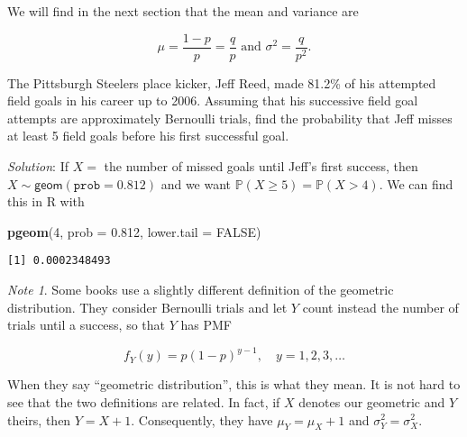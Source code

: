 \documentclass[]{book}
\newenvironment{Shaded}{\begin{snugshade}}{\end{snugshade}}
\newcommand{\KeywordTok}[1]{\textcolor[rgb]{0.13,0.29,0.53}{\textbf{{#1}}}}
\newcommand{\DataTypeTok}[1]{\textcolor[rgb]{0.13,0.29,0.53}{{#1}}}
\newcommand{\DecValTok}[1]{\textcolor[rgb]{0.00,0.00,0.81}{{#1}}}
\newcommand{\FloatTok}[1]{\textcolor[rgb]{0.00,0.00,0.81}{{#1}}}
\newcommand{\OtherTok}[1]{\textcolor[rgb]{0.56,0.35,0.01}{{#1}}}
\newcommand{\NormalTok}[1]{{#1}}
\numberwithin{equation}{chapter}
\numberwithin{figure}{chapter}
\theoremstyle{plain}
\theoremstyle{definition}
\theoremstyle{remark}
\newtheorem{note}[thm]{Note}
\theoremstyle{definition}
\theoremstyle{definition}
\theoremstyle{remark}
\let\BeginKnitrBlock\begin \let\EndKnitrBlock\end
\begin{document}
We will find in the next section that the mean and variance are

\begin{equation}
\mu=\frac{1-p}{p}=\frac{q}{p}\mbox{ and }\sigma^{2}=\frac{q}{p^{2}}.
\end{equation}

\bigskip

\BeginKnitrBlock{example}
\protect\hypertarget{ex:unnamed-chunk-235}{}{\label{ex:unnamed-chunk-235}}The
Pittsburgh Steelers place kicker, Jeff Reed, made 81.2\% of his
attempted field goals in his career up to 2006. Assuming that his
successive field goal attempts are approximately Bernoulli trials, find
the probability that Jeff misses at least 5 field goals before his first
successful goal.
\EndKnitrBlock{example}

\emph{Solution}: If \(X=\) the number of missed goals until Jeff's first
success, then \(X\sim\mathsf{geom}(\mathtt{prob}=0.812)\) and we want
\(\mathbb{P}(X\geq5)=\mathbb{P}(X>4)\). We can find this in R with

\begin{Shaded}
\begin{Highlighting}[]
\KeywordTok{pgeom}\NormalTok{(}\DecValTok{4}\NormalTok{, }\DataTypeTok{prob =} \FloatTok{0.812}\NormalTok{, }\DataTypeTok{lower.tail =} \OtherTok{FALSE}\NormalTok{)}
\end{Highlighting}
\end{Shaded}

\begin{verbatim}
[1] 0.0002348493
\end{verbatim}

\bigskip

\begin{note}
Some books use a slightly different definition of the geometric
distribution. They consider Bernoulli trials and let \(Y\) count instead
the number of trials until a success, so that \(Y\) has PMF

\begin{equation}
f_{Y}(y)=p(1-p)^{y-1},\quad y=1,2,3,\ldots
\end{equation}

When they say ``geometric distribution'', this is what they mean. It is
not hard to see that the two definitions are related. In fact, if \(X\)
denotes our geometric and \(Y\) theirs, then \(Y=X+1\). Consequently,
they have \(\mu_{Y}=\mu_{X}+1\) and \(\sigma_{Y}^{2}=\sigma_{X}^{2}\).
\end{note}
\end{document}
